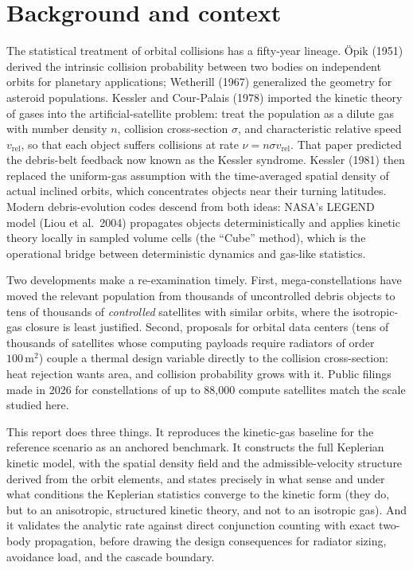 \documentclass[11pt,a4paper]{article}
\newcommand{\vrel}{v_{\mathrm{rel}}}
\begin{document}
\section{Background and context}

The statistical treatment of orbital collisions has a fifty-year lineage. \"Opik (1951)
derived the intrinsic collision probability between two bodies on independent orbits for
planetary applications; Wetherill (1967) generalized the geometry for asteroid
populations. Kessler and Cour-Palais (1978) imported the kinetic theory of gases into the
artificial-satellite problem: treat the population as a dilute gas with number density
$n$, collision cross-section $\sigma$, and characteristic relative speed $\vrel$, so that
each object suffers collisions at rate $\nu = n \sigma \vrel$. That paper predicted the
debris-belt feedback now known as the Kessler syndrome. Kessler (1981) then replaced the
uniform-gas assumption with the time-averaged spatial density of actual inclined orbits,
which concentrates objects near their turning latitudes. Modern debris-evolution codes
descend from both ideas: NASA's LEGEND model (Liou et al.\ 2004) propagates objects
deterministically and applies kinetic theory locally in sampled volume cells (the
``Cube'' method), which is the operational bridge between deterministic dynamics and
gas-like statistics.

Two developments make a re-examination timely. First, mega-constellations have moved the
relevant population from thousands of uncontrolled debris objects to tens of thousands of
\emph{controlled} satellites with similar orbits, where the isotropic-gas closure is least
justified. Second, proposals for orbital data centers (tens of thousands of satellites
whose computing payloads require radiators of order $100\,\mathrm{m}^2$) couple a thermal
design variable directly to the collision cross-section: heat rejection wants area, and
collision probability grows with it. Public filings made in 2026 for constellations of up
to 88{,}000 compute satellites match the scale studied here.

This report does three things. It reproduces the kinetic-gas baseline for the reference
scenario as an anchored benchmark. It constructs the full Keplerian kinetic model, with
the spatial density field and the admissible-velocity structure derived from the orbit
elements, and states precisely in what sense and under what conditions the Keplerian
statistics converge to the kinetic form (they do, but to an anisotropic, structured
kinetic theory, and not to an isotropic gas). And it validates the analytic rate against
direct conjunction counting with exact two-body propagation, before drawing the design
consequences for radiator sizing, avoidance load, and the cascade boundary.
\end{document}
